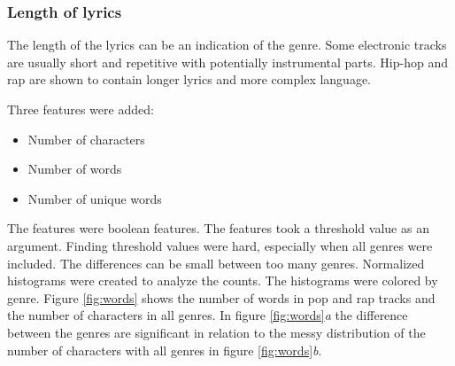 \documentclass[a4paper, 12pt]{article}
\begin{document}
\subsubsection*{Length of lyrics}
The length of the lyrics can be an indication of the genre.
Some electronic tracks are usually short and repetitive with potentially instrumental parts.
Hip-hop and rap are shown to contain longer lyrics and more complex language. \cite{rap-long}

Three features were added:
\begin{itemize}
    \item {Number of characters}
    \item {Number of words}
    \item {Number of unique words}
\end{itemize}

The features were boolean features.
The features took a threshold value as an argument.
Finding threshold values were hard, especially when all genres were included.
The differences can be small between too many genres.
Normalized histograms were created to analyze the counts.
The histograms were colored by genre.
Figure \ref{fig:words} shows the number of words in pop and rap tracks and the number of characters in all genres.
In figure \ref{fig:words}\textit{a} the difference between the genres are significant in relation to the messy distribution of the number of characters with all genres in figure \ref{fig:words}\textit{b}.
\end{document}
